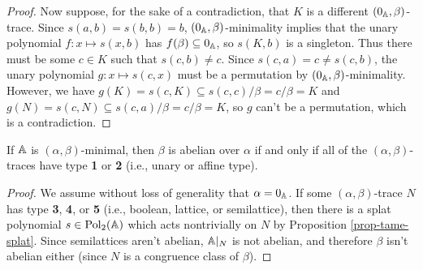 \begin{appendices}
\begin{proof}
Now suppose, for the sake of a contradiction, that $K$ is a different $(0_{\mathbb{A}},\beta)$-trace. Since $s(a,b) = s(b,b) = b$, $(0_{\mathbb{A}},\beta)$-minimality implies that the unary polynomial $f : x \mapsto s(x,b)$ has $f(\beta) \subseteq 0_{\mathbb{A}}$, so $s(K,b)$ is a singleton. Thus there must be some $c \in K$ such that $s(c,b) \ne c$. Since $s(c,a) = c \ne s(c,b)$, the unary polynomial $g : x \mapsto s(c,x)$ must be a permutation by $(0_{\mathbb{A}},\beta)$-minimality. However, we have $g(K) = s(c,K) \subseteq s(c,c)/\beta = c/\beta = K$ and $g(N) = s(c,N) \subseteq s(c,a)/\beta = c/\beta = K$, so $g$ can't be a permutation, which is a contradiction.
\end{proof}

\begin{prop}\label{prop-abelian-minimal-set} If $\mathbb{A}$ is $(\alpha,\beta)$-minimal, then $\beta$ is abelian over $\alpha$ if and only if all of the $(\alpha,\beta)$-traces have type \textbf{1} or \textbf{2} (i.e., unary or affine type).
\end{prop}
\begin{proof} We assume without loss of generality that $\alpha = 0_{\mathbb{A}}$. If some $(\alpha,\beta)$-trace $N$ has type \textbf{3}, \textbf{4}, or \textbf{5} (i.e., boolean, lattice, or semilattice), then there is a splat polynomial $s \in \operatorname{Pol}_2(\mathbb{A})$ which acts nontrivially on $N$ by Proposition \ref{prop-tame-splat}. Since semilattices aren't abelian, $\mathbb{A}|_N$ is not abelian, and therefore $\beta$ isn't abelian either (since $N$ is a congruence class of $\beta$).


\end{proof}
\end{appendices}

